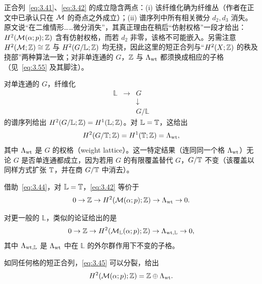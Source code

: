 \begin{yizhu}[易错点]正合列~\eqref{eq:3.41}、\eqref{eq:3.42} 的成立隐含两点：(i) 该纤维化确为纤维丛（作者在正文中已承认只在 ${\mathcal{M}}$ 的奇点之外成立）；(ii) 谱序列中所有相关微分 $d_2,d_3$ 消失。原文说“在二维情形……微分消失”，其真正理由在稍后“仿射权格”一段才给出：$H^2({\mathcal{M}}(\alpha;p);{\mathbb{Z}})$ 含有仿射权格，而若 $d_2$ 非零，该格不可能嵌入。另需注意 $H^2({\mathcal{M}};{\mathbb{Z}})\cong{\mathbb{Z}}$ 与 $H^2(G/\mathbb{L};{\mathbb{Z}})$ 均无挠，因此这里的短正合列与“$H^2(X;{\mathbb{Z}})$ 的秩及挠部”两种算法一致；对非单连通的 $G$，${\mathbb{Z}}$ 与 $\Lambda_{\rm wt}$ 都须换成相应的子格（见~\eqref{eq:3.55} 及其脚注）。\end{yizhu}

对单连通的 $G$，纤维化
\setcounter{equation}{42}
\begin{equation}\label{eq:3.43}
  \begin{array}{ccc} \mathbb{L} & \to & G\\ & & \downarrow\\ & & G/\mathbb{L}\end{array}
\end{equation}
的谱序列给出 $H^2(G/\mathbb{L};{\mathbb{Z}})=H^1(\mathbb{L};{\mathbb{Z}})$。对 $\mathbb{L}={\mathbb{T}}$，这给出
\setcounter{equation}{43}
\begin{equation}\label{eq:3.44}
  H^2(G/{\mathbb{T}};{\mathbb{Z}})=H^1({\mathbb{T}};{\mathbb{Z}})=\Lambda_{\rm wt},
\end{equation}
其中 $\Lambda_{\rm wt}$ 是 $G$ 的权格（weight lattice）。这一特定结果（连同同一个格 $\Lambda_{\rm wt}$）无论 $G$ 是否单连通都成立，因为若用 $G$ 的有限覆盖替代 $G$，$G/{\mathbb{T}}$ 不变（该覆盖以同样方式扩张 ${\mathbb{T}}$，并在商 $G/{\mathbb{T}}$ 中消去）。

借助~\eqref{eq:3.44}，对 $\mathbb{L}={\mathbb{T}}$，\eqref{eq:3.42} 等价于
\setcounter{equation}{44}
\begin{equation}\label{eq:3.45}
  0\to{\mathbb{Z}}\to
H^2({\mathcal{M}}(\alpha;p);{\mathbb{Z}})\to \Lambda_{\rm wt}\to 0.
\end{equation}

对更一般的 $\mathbb{L}$，类似的论证给出的是
\setcounter{equation}{45}
\begin{equation}\label{eq:3.46}
  0\to{\mathbb{Z}}\to
H^2({\mathcal{M}}_\mathbb{L}(\alpha;p);{\mathbb{Z}})\to \Lambda_{{\rm wt},\mathbb{L}}\to 0,
\end{equation}
其中 $\Lambda_{{\rm wt},\mathbb{L}}$ 是 $\Lambda_{\rm wt}$ 中在 $\mathbb{L}$ 的外尔群作用下不变的子格。

如同任何格的短正合列，\eqref{eq:3.45} 可以分裂，给出
\setcounter{equation}{46}
\begin{equation}\label{eq:3.47}
  H^2({\mathcal{M}}(\alpha;p);{\mathbb{Z}})={\mathbb{Z}}\oplus \Lambda_{\rm wt}.
\end{equation}

